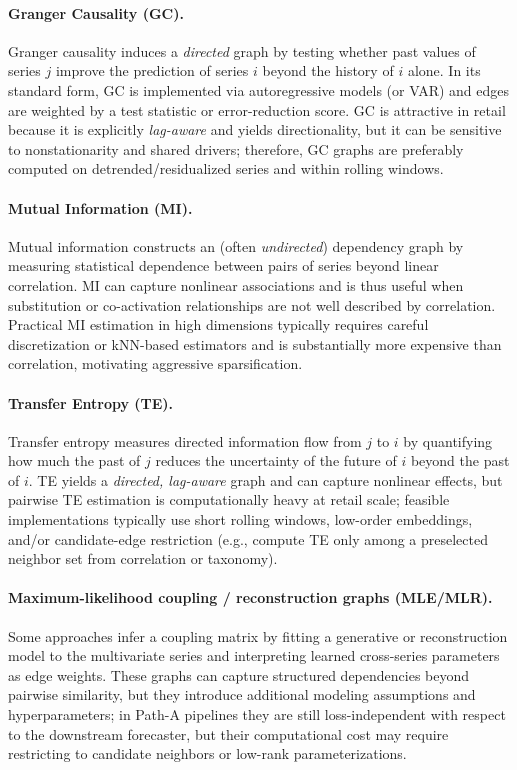 \paragraph{Granger Causality (GC).}
Granger causality induces a \emph{directed} graph by testing whether past values of series $j$ improve the prediction of series $i$ beyond the history of $i$ alone. In its standard form, GC is implemented via autoregressive models (or VAR) and edges are weighted by a test statistic or error-reduction score. GC is attractive in retail because it is explicitly
\emph{lag-aware} and yields directionality, but it can be sensitive to nonstationarity and shared drivers; therefore, GC graphs are preferably computed on detrended/residualized series and within rolling windows.

\paragraph{Mutual Information (MI).}
Mutual information constructs an (often \emph{undirected}) dependency graph by measuring statistical dependence between pairs of series beyond linear correlation. MI can capture nonlinear associations and is thus useful when substitution or co-activation relationships are not well described by correlation. Practical MI estimation in high dimensions typically requires careful discretization or kNN-based estimators and is substantially more expensive than correlation, motivating aggressive sparsification.

\paragraph{Transfer Entropy (TE).}
Transfer entropy measures directed information flow from $j$ to $i$ by quantifying how much the past of $j$ reduces the uncertainty of the future of $i$ beyond the past of $i$. TE yields a \emph{directed, lag-aware} graph and can capture nonlinear effects, but pairwise TE estimation is computationally heavy at retail scale; feasible implementations typically use short rolling windows, low-order embeddings, and/or candidate-edge restriction (e.g., compute TE only among a preselected neighbor set from correlation or taxonomy).

\paragraph{Maximum-likelihood coupling / reconstruction graphs (MLE/MLR).}
Some approaches infer a coupling matrix by fitting a generative or reconstruction model to the multivariate series and interpreting learned cross-series parameters as edge weights. These graphs can capture structured dependencies beyond pairwise similarity, but they introduce additional modeling assumptions and hyperparameters; in Path-A pipelines they are still loss-independent with respect to the downstream forecaster, but their computational cost may require restricting to candidate neighbors or low-rank parameterizations.


